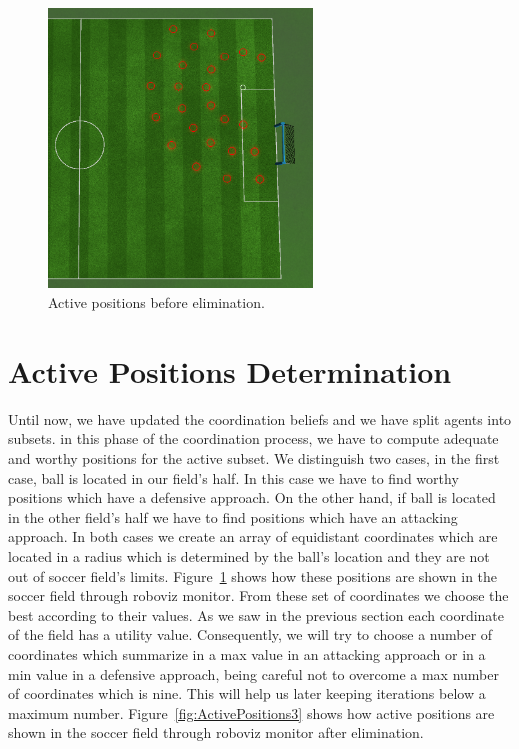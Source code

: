 \begin{figure}[t!]
\centering
  \includegraphics[width=7cm]{Chapter4/figures/ActivePositions2.png}
  \caption{Active positions before elimination.} 
  \label{fig:ActivePositions2}
\end{figure}

\section{Active Positions Determination}
Until now, we have updated the coordination beliefs and we have split agents into subsets. in this phase of the coordination process, we have to compute adequate and worthy positions for the active subset. We distinguish two cases, in the first case, ball is located in our field's half. In this case we have to find worthy positions which have a defensive approach. On the other hand, if ball is located in the other field's half we have to find positions which have an attacking approach. In both cases we create an array of equidistant coordinates which are located in a radius which is determined by the ball's location and they are not out of soccer field's limits. Figure~\ref{fig:ActivePositions2} shows how these positions are shown in the soccer field through roboviz monitor. 
From these set of coordinates we choose the best according to their values. As we saw in the previous section each coordinate of the field has a utility value. Consequently, we will try to choose a number of coordinates which summarize in a max value in an attacking approach or in a min value in a defensive approach, being careful not to overcome a max number of coordinates which is nine. This will help us later keeping iterations below a maximum number. Figure~\ref{fig:ActivePositions3} shows how active positions are shown in the soccer field through roboviz monitor after elimination. 


